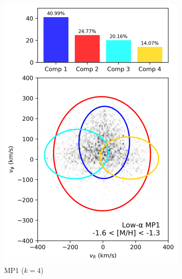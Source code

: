 \documentclass[a4paper,12pt]{article}
\begin{document}
\begin{figure}[H]
\begin{subfigure}{0.24\linewidth}
    \includegraphics[width=\linewidth]{../figures/gmm_mp1_low_alpha_k4.png}
    \caption{MP1 ($k{=}4$)}
    \label{fig:gmm_mp1_lo}
  \end{subfigure}\hfill
  \begin{subfigure}{0.24\linewidth}
    \centering

\end{subfigure}
\end{figure}
\end{document}
